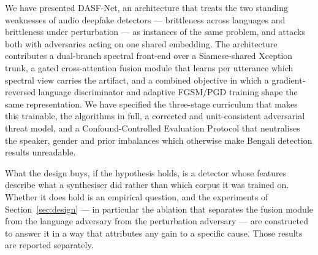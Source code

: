 \documentclass[conference]{IEEEtran}
\begin{document}
We have presented DASF-Net, an architecture that treats the two standing
weaknesses of audio deepfake detectors --- brittleness across languages and
brittleness under perturbation --- as instances of the same problem, and
attacks both with adversaries acting on one shared embedding. The
architecture contributes a dual-branch spectral front-end over a
Siamese-shared Xception trunk, a gated cross-attention fusion module that
learns per utterance which spectral view carries the artifact, and a
combined objective in which a gradient-reversed language discriminator and
adaptive FGSM/PGD training shape the same representation. We have specified
the three-stage curriculum that makes this trainable, the algorithms in
full, a corrected and unit-consistent adversarial threat model, and a
Confound-Controlled Evaluation Protocol that neutralises the speaker,
gender and prior imbalances which otherwise make Bengali detection results
unreadable.

What the design buys, if the hypothesis holds, is a detector whose features
describe what a synthesiser did rather than which corpus it was trained on.
Whether it does hold is an empirical question, and the experiments of
Section~\ref{sec:design} --- in particular the ablation that separates the
fusion module from the language adversary from the perturbation adversary
--- are constructed to answer it in a way that attributes any gain to a
specific cause. Those results are reported separately.
\end{document}
